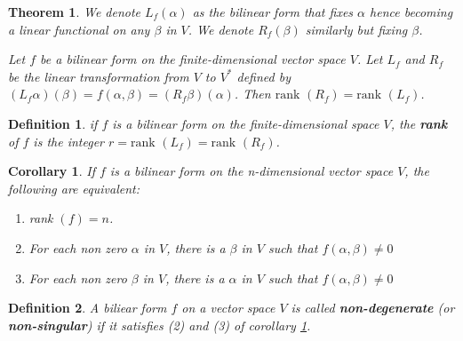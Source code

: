 \documentclass{article}
\newtheorem{theorem}{Theorem}[section]
\newtheorem{definition}{Definition}[section]
\newtheorem{corollary}{Corollary}[theorem]
\numberwithin{theorem}{subsection} %
\numberwithin{definition}{subsection} %
\numberwithin{proposition}{subsection} %
\begin{document}
\begin{theorem}
    We denote $L_f(\alpha)$ as the bilinear form that fixes $\alpha$ hence becoming
    a linear functional on any $\beta$ in $V$. We denote $R_f(\beta)$ similarly but fixing
    $\beta$. 

    Let $f$ be a bilinear form on the finite-dimensional vector space $V$. Let $L_f$ and
    $R_f$ be the linear transformation from $V$ to $V^*$ defined by $(L_f\alpha)(\beta)
    = f(\alpha, \beta) = (R_f\beta)(\alpha)$. Then $\text{rank }(R_f) = \text{rank }(L_f)$.
\end{theorem}

\begin{definition}
    if $f$ is a bilinear form on the finite-dimensional space $V$, the \textbf{rank} of
    $f$ is the integer $r = \text{rank }(L_f) = \text{rank }(R_f)$.
\end{definition}

\begin{corollary}\label{rankbilinear}
    If $f$ is a bilinear form on the n-dimensional vector space $V$, the following are
    equivalent: 
    \begin{enumerate}
        \item rank $(f) = n$.
        \item For each non zero $\alpha$ in $V$, there is a $\beta$ in $V$ such that
            $f(\alpha, \beta) \neq 0$
        \item For each non zero $\beta$ in $V$, there is a $\alpha$ in $V$ such that
            $f(\alpha, \beta) \neq 0$
    \end{enumerate}
\end{corollary}

\begin{definition}
    A biliear form $f$ on a vector space $V$ is called \textbf{non-degenerate} (or
    \textbf{non-singular}) if it satisfies (2) and (3) of corollary \ref{rankbilinear}.
\end{definition}
\end{document}
